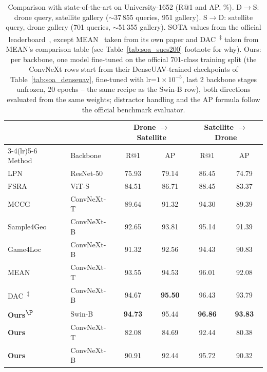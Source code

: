 \documentclass[conference]{IEEEtran}
\begin{document}
\begin{table}[htbp]
\caption{Comparison with state-of-the-art on University-1652 (R@1 and AP, \%).
         D$\!\to\!$S: drone query, satellite gallery ($\sim$37\,855 queries, 951 gallery).
         S$\!\to\!$D: satellite query, drone gallery (701 queries,
         $\sim$51\,355 gallery).
         SOTA values from the official leaderboard~\cite{zheng2020university1652},
         except MEAN~\cite{chen2025mean} taken from its own paper and
         DAC~\cite{xia2024dac}\textsuperscript{$\ddagger$} taken from MEAN's
         comparison table (see Table~\ref{tab:soa_sues200} footnote for why).
         Ours: per backbone, one model fine-tuned on the official 701-class
         training split (the ConvNeXt rows start from their DenseUAV-trained
         checkpoints of Table~\ref{tab:soa_denseuav}, fine-tuned with
         lr=$1\times10^{-5}$, last 2 backbone stages unfrozen, 20 epochs --
         the same recipe as the Swin-B row), both directions evaluated from
         the same weights; distractor handling and the AP formula follow the
         official benchmark evaluator.}
\label{tab:soa_u1652}
\centering
\footnotesize
\setlength{\tabcolsep}{8pt}
\begin{tabular}{l l cc cc}
\toprule
& & \multicolumn{2}{c}{Drone $\to$ Satellite}
& \multicolumn{2}{c}{Satellite $\to$ Drone} \\
\cmidrule(lr){3-4}\cmidrule(lr){5-6}
Method & Backbone & R@1 & AP & R@1 & AP \\
\midrule
LPN~\cite{wang2021lpn}                 & ResNet-50  & 75.93 & 79.14 & 86.45 & 74.79 \\
FSRA~\cite{dai2022fsra}                & ViT-S      & 84.51 & 86.71 & 88.45 & 83.37 \\
MCCG~\cite{shen2024mccg}               & ConvNeXt-T & 89.64 & 91.32 & 94.30 & 89.39 \\
Sample4Geo~\cite{deuser2023sample4geo} & ConvNeXt-B & 92.65 & 93.81 & 95.14 & 91.39 \\
Game4Loc~\cite{ji2024game4loc}         & ConvNeXt-B & 91.32 & 92.56 & 94.43 & 90.83 \\
MEAN~\cite{chen2025mean}               & ConvNeXt-T & 93.55 & 94.53 & 96.01 & 92.08 \\
DAC~\cite{xia2024dac}\textsuperscript{$\ddagger$}                & ConvNeXt-B & 94.67 & \textbf{95.50} & 96.43 & 93.79 \\
\midrule
\textbf{Ours}\textsuperscript{$\P$} & Swin-B & \textbf{94.73} & 95.44 & \textbf{96.86} & \textbf{93.83} \\
\textbf{Ours} & ConvNeXt-T & 82.08 & 84.69 & 92.44 & 80.38 \\
\textbf{Ours} & ConvNeXt-B & 90.91 & 92.44 & 95.72 & 90.32 \\
\bottomrule
\end{tabular}


\end{table}
\end{document}
